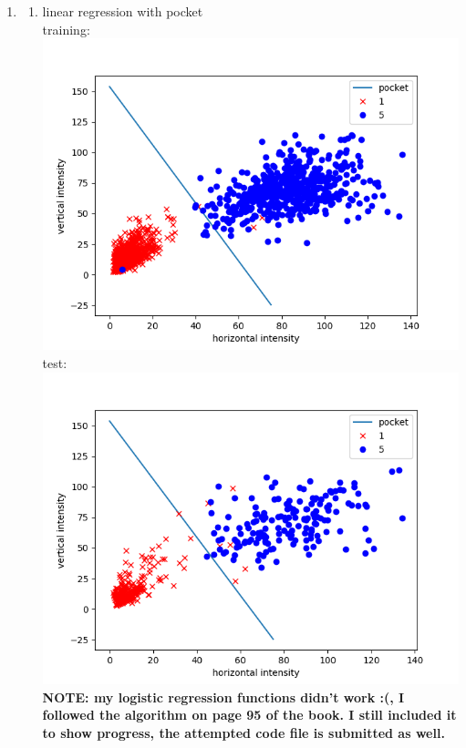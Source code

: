 \documentclass{article}
\begin{document}
    \begin{enumerate}
        \item \begin{enumerate}[label=(\alph*)]
            \item linear regression with pocket\\
                training:\\\includegraphics[scale=0.5]{images/linearpocket.png}\\
                test:\\\includegraphics[scale=0.5]{images/linearpockettest.png}\\[0.25in]
                \textbf{NOTE: my logistic regression functions didn't work :(, I followed the algorithm on page 95 of the book. I still included it to show progress, the attempted code file is submitted as well.}\\

\end{enumerate}
\end{enumerate}
\end{document}
